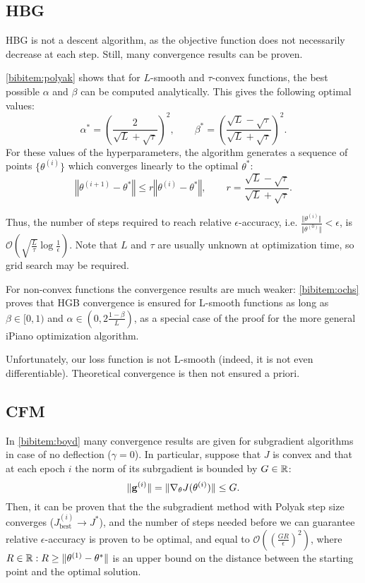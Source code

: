 \subsection{HBG}
HBG is not a descent algorithm, as the objective function does not necessarily decrease at each step. Still, many convergence results can be proven.  

\ref{bibitem:polyak} shows that for $L$-smooth and $\tau$-convex functions, the best possible $\alpha$ and $\beta$ can be computed analytically. This gives the following optimal values:
\[
\alpha^* = \left(\frac{2}{\sqrt{L} + \sqrt{\tau}}\right)^2,
\qquad
\beta^* = \left(\frac{\sqrt{L} - \sqrt{\tau}}{\sqrt{L} + \sqrt{\tau}}\right)^2.
\]
For these values of the hyperparameters, the algorithm generates a sequence of points $\{\theta^{(i)}\}$ which converges linearly to the optimal $\theta^*$:
\[
\left\Vert \theta^{(i+1)} - \theta^* \right\Vert 
\leq 
r \left\Vert \theta^{(i)} - \theta^* \right\Vert,
\qquad r = \frac{\sqrt{L} - \sqrt{\tau}}{\sqrt{L} + \sqrt{\tau}}.
\]

Thus, the number of steps required to reach relative $\epsilon$-accuracy, i.e. $\frac{\Vert\theta^{(i)}\Vert}{\Vert\theta^{(0)}\Vert} < \epsilon$, is $\mathcal{O} \left(\sqrt{\frac{L}{\tau}} \log \frac{1}{\epsilon}\right)$. Note that $L$ and $\tau$ are usually unknown at optimization time, so grid search may be required.

For non-convex functions the convergence results are much weaker: \ref{bibitem:ochs} proves that HGB convergence is ensured for L-smooth functions as long as $\beta \in [0, 1)$ and $\alpha \in \left(0, 2\frac{1-\beta}{L}\right)$, as a special case of the proof for the more general iPiano optimization algorithm.

Unfortunately, our loss function is not L-smooth (indeed, it is not even differentiable). Theoretical convergence is then not ensured a priori.


\subsection{CFM}
\label{cfm_conv}
In \ref{bibitem:boyd} many convergence results are given for subgradient algorithms in case of no deflection ($\gamma = 0$). In particular, suppose that $J$ is convex and that at each epoch $i$ the norm of its subrgadient is bounded by $G \in \mathbb{R}$:
\[
    \Vert\mathbf{g}^{(i)}\Vert = \Vert\nabla_\theta J(\theta^{(i)})\Vert \leq G.
\]
Then, it can be proven that the the subgradient method with Polyak step size converges ($J_{\text{best}}^{(i)} \rightarrow J^*$), and the number of steps needed before we can guarantee relative $\epsilon$-accuracy is proven to be optimal, and equal to $\mathcal{O}\left(\left(\frac{GR}{\epsilon}\right)^2\right)$, where $R \in \mathbb{R}: R \geq \Vert \theta^{(1)} - \theta^* \Vert$ 
is an upper bound on the distance between the starting point and the optimal solution.


